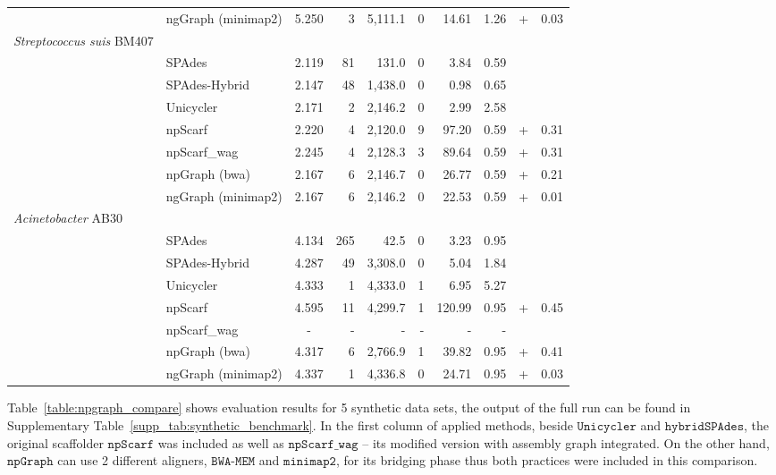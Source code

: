 \documentclass[10pt,twocolumn,twoside]{genpaper}
\newcommand{\npscarf}{$\mathtt{npScarf}$}
\newcommand{\npscarfg}{$\mathtt{npScarf\_wag}$}
\newcommand{\npgraph}{$\mathtt{npGraph}$}
\newcommand{\unicycler}{$\mathtt{Unicycler}$}
\newcommand{\minimap}{$\mathtt{minimap2}$}
\newcommand{\bwa}{$\mathtt{BWA\text{-}MEM}$}
\begin{document}
\begin{longtable}{llcrrrrr@{\hspace{2pt}}c@{\hspace{2pt}}r}
 & ngGraph (minimap2)  & 5.250 & 3  & 5,111.1  & 0  & 14.61  &  1.26 & + & 0.03 \\
\rowcolor{Gray} \multicolumn{10}{l}
{\emph{Streptococcus suis} BM407} \\*  
 & SPAdes  & 2.119 &  81 &  131.0 & 0  & 3.84  & 0.59  &  &  \\*
 & SPAdes-Hybrid  & 2.147 & 48  &  1,438.0 &  0 &  0.98 & 0.65  &  &  \\*
 & Unicycler  & 2.171 &  2 &  2,146.2 & 0  &  2.99 &  2.58  &  &  \\*
 & npScarf  & 2.220 &  4 &  2,120.0  & 9  & 97.20  & 0.59 & + & 0.31 \\*
 & npScarf\_wag  & 2.245 & 4  &  2,128.3  & 3  &  89.64 & 0.59 & + &  0.31\\*
 & npGraph (bwa)  & 2.167 & 6  & 2,146.7  &  0 &  26.77 & 0.59  & + &  0.21\\*
 & ngGraph (minimap2)  & 2.167 & 6  &  2,146.2 &  0 & 22.53  &  0.59 & + & 0.01 \\
\rowcolor{Gray} \multicolumn{10}{l}
{\emph{Acinetobacter} AB30} \\*  
 & SPAdes  & 4.134 & 265  & 42.5  &  0 &  3.23 & 0.95  &  &  \\*
 & SPAdes-Hybrid  & 4.287 & 49  &  3,308.0 &  0 & 5.04  & 1.84  &  &  \\*
 & Unicycler  & 4.333 & 1  &  4,333.0 &  1 & 6.95  &  5.27 &  &  \\*
 & npScarf  & 4.595 & 11  & 4,299.7  & 1  & 120.99  & 0.95  & + & 0.45 \\*
 & npScarf\_wag  & - & -  &  - & -  &  - &  - &  &  \\*
 & npGraph (bwa)  & 4.317 & 6  &  2,766.9 & 1  &  39.82 &  0.95 & + & 0.41 \\*
 & ngGraph (minimap2)  & 4.337 & 1  &  4,336.8 & 0  & 24.71  & 0.95  & + & 0.03 \\
\end{longtable}

\normalsize

Table~\ref{table:npgraph_compare} shows evaluation results for 5 synthetic data sets, the output of the full run can be found in Supplementary Table~\ref{supp_tab:synthetic_benchmark}.
In the first column of applied methods, beside \unicycler{} and $\mathtt{hybridSPAdes}$, the original scaffolder \npscarf{} was included as well as \npscarfg{} -- its modified version with assembly graph integrated.
On the other hand, \npgraph{} can use 2 different aligners, \bwa{} and \minimap{}, for its bridging phase thus both practices were included in this comparison.
\end{document}
